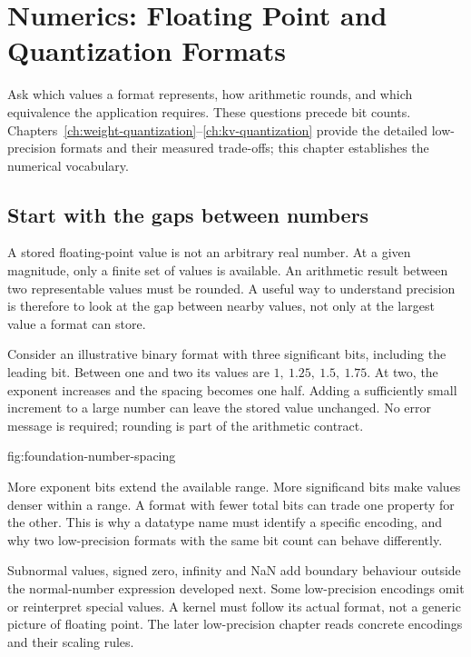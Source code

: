 \chapter{Numerics: Floating Point and Quantization Formats}\label{app:numerics}
\begin{ChapterIntent}
Ask which values a format represents, how arithmetic rounds, and which
equivalence the application requires. These questions precede bit counts.
Chapters~\ref{ch:weight-quantization}--\ref{ch:kv-quantization} provide the detailed low-precision formats and their
measured trade-offs; this chapter establishes the numerical vocabulary.
\end{ChapterIntent}

\section{Start with the gaps between numbers}
A stored floating-point value is not an arbitrary real number. At a
given magnitude, only a finite set of values is available. An arithmetic
result between two representable values must be rounded. A useful way
to understand precision is therefore to look at the gap between nearby
values, not only at the largest value a format can store.

Consider an illustrative binary format with three significant bits,
including the leading bit. Between one and two its values are
$1,\ 1.25,\ 1.5,\ 1.75$. At two, the exponent increases and the
spacing becomes one half. Adding a sufficiently small increment to
a large number can leave the stored value unchanged. No error message
is required; rounding is part of the arithmetic contract.

{fig:foundation-number-spacing}

More exponent bits extend the available range. More significand bits
make values denser within a range. A format with fewer total bits can
trade one property for the other. This is why a datatype name must
identify a specific encoding, and why two low-precision formats with
the same bit count can behave differently.

Subnormal values, signed zero, infinity and NaN add boundary behaviour
outside the normal-number expression developed next. Some low-precision
encodings omit or reinterpret special values. A kernel must follow its
actual format, not a generic picture of floating point. The later
low-precision chapter reads concrete encodings and their scaling rules.

